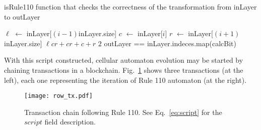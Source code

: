 \documentclass[runningheads]{llncs}
\newcommand{\dnote}[1]{\textcolor{red}{D: {#1}}}
\newcommand{\vk}[1]{\textcolor{blue}{V: {#1}}}
\newcommand{\payload}{\textit{payload}}
\newcommand{\script}{\textit{script}}
\def\Let#1#2{\State #1 $\gets$ #2}
\begin{document}
    \begin{algorithm}[H]
        \caption{isRule110 function that checks the correctness of the transformation from
        inLayer to outLayer}
        \label{alg:isRule110mod4}
        \begin{algorithmic}[1]
            \Let{$\ell$}{inLayer[$(i-1)$\Mod inLayer.size]}
            \Let{$c$}{inLayer[$i$]}
            \Let{$r$}{inLayer[$(i+1)$\Mod inLayer.size]}
            \State
            \Return $\ell c r + cr + c + r$ \Mod $2$
            \EndFunction
            \State \Return outLayer == inLayer.indeces.map(calcBit)
            \EndFunction
            \vskip8pt
        \end{algorithmic}
    \end{algorithm}

    With this script constructed, cellular automaton evolution may be started by
    chaining transactions in a blockchain. Fig.~\ref{fig:txs} shows three
    transactions (at the left), each one representing the iteration of Rule 110
    automaton (at the right).

    \begin{figure}[h]
        \centering
        \texttt{[image: row\_tx.pdf]}
        \caption{Transaction chain following Rule 110. See Eq.~\ref{eq:script} for the
            $script$ field description.
        \label{fig:txs} }
    \end{figure}
\end{document}
